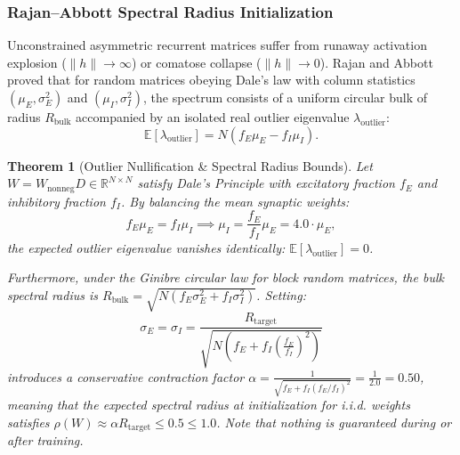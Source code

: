 \documentclass[11pt,a4paper]{article}
\theoremstyle{plain}
\newtheorem{theorem}{Theorem}[section]
\theoremstyle{definition}
\theoremstyle{remark}
\begin{document}
\subsubsection{Rajan--Abbott Spectral Radius Initialization}

Unconstrained asymmetric recurrent matrices suffer from runaway activation explosion ($\|h\| \to \infty$) or comatose collapse ($\|h\| \to 0$). Rajan and Abbott~\cite{rajan2006eigenvalue} proved that for random matrices obeying Dale's law with column statistics $(\mu_E, \sigma_E^2)$ and $(\mu_I, \sigma_I^2)$, the spectrum consists of a uniform circular bulk of radius $R_{\mathrm{bulk}}$ accompanied by an isolated real outlier eigenvalue $\lambda_{\mathrm{outlier}}$:
\begin{equation}
    \mathbb{E}[\lambda_{\mathrm{outlier}}] = N \left( f_E \mu_E - f_I \mu_I \right).
\end{equation}

\begin{theorem}[Outlier Nullification \& Spectral Radius Bounds]
\label{thm:rajan_abbott}
Let $W = W_{\mathrm{nonneg}} D \in \mathbb{R}^{N \times N}$ satisfy Dale's Principle with excitatory fraction $f_E$ and inhibitory fraction $f_I$. By balancing the mean synaptic weights:
\begin{equation}
    f_E \mu_E = f_I \mu_I \implies \mu_I = \frac{f_E}{f_I} \mu_E = 4.0 \cdot \mu_E,
\end{equation}
the expected outlier eigenvalue vanishes identically: $\mathbb{E}[\lambda_{\mathrm{outlier}}] = 0$. 

Furthermore, under the Ginibre circular law for block random matrices, the bulk spectral radius is $R_{\mathrm{bulk}} = \sqrt{N(f_E \sigma_E^2 + f_I \sigma_I^2)}$. Setting:
\begin{equation}
    \sigma_E = \sigma_I = \frac{R_{\mathrm{target}}}{\sqrt{N \left( f_E + f_I \left(\frac{f_E}{f_I}\right)^2 \right)}}
\end{equation}
introduces a conservative contraction factor $\alpha = \frac{1}{\sqrt{f_E + f_I(f_E/f_I)^2}} = \frac{1}{2.0} = 0.50$, meaning that the expected spectral radius at initialization for i.i.d. weights satisfies $\rho(W) \approx \alpha R_{\mathrm{target}} \le 0.5 \le 1.0$. Note that nothing is guaranteed during or after training.
\end{theorem}
\end{document}

